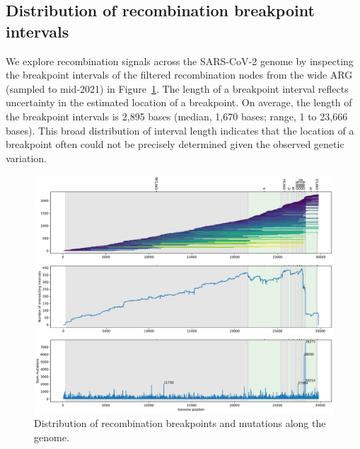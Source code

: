 \documentclass{article}
\begin{document}
\subsection{Distribution of recombination breakpoint intervals}
\label{sec:breakpoint_intervals}


We explore recombination signals across the SARS-CoV-2 genome by inspecting the
breakpoint intervals of the filtered recombination nodes from the wide ARG
(sampled to mid-2021) in Figure~\ref{fig:breakpoint-distribution}. The length
of a breakpoint interval reflects uncertainty in the estimated location of a
breakpoint. On average, the length of the breakpoint intervals is 2,895 bases
(median, 1,670 bases; range, 1 to 23,666 bases). This broad distribution of
interval length indicates that the location of a breakpoint often could not be
precisely determined given the observed genetic variation.

\begin{figure}
\centering
\includegraphics[width=\textwidth]{figures/recombination_intervals.pdf}
\caption{\label{fig:breakpoint-distribution}
Distribution of recombination breakpoints and mutations along the genome.}
\end{figure}
\end{document}
